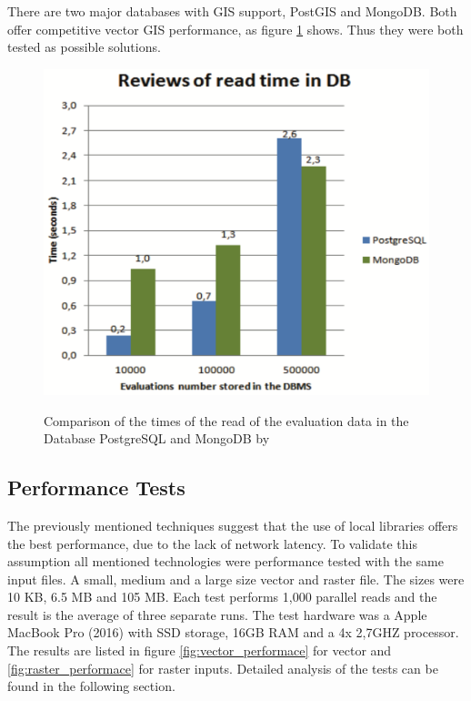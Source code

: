 There are two major databases with GIS support, PostGIS and MongoDB. Both offer competitive vector GIS performance, as figure \ref{img:mongo-vs-postgres} shows. Thus they were both tested as possible solutions.

\begin{figure}[H]
	\centering
	\includegraphics[width=0.6\columnwidth]{res/mongo-vs-postgres}\\
	\caption[]{Comparison of the times of the read of the evaluation data in the Database PostgreSQL and MongoDB by \cite{Maia2016}}
	\label{img:mongo-vs-postgres}
\end{figure}


\subsection{Performance Tests}
The previously mentioned techniques suggest that the use of local libraries offers the best performance, due to the lack of network latency. To validate this assumption all mentioned technologies were performance tested with the same input files. A small, medium and a large size vector and raster file. The sizes were 10 KB, 6.5 MB and 105 MB. Each test performs 1,000 parallel reads and the result is the average of three separate runs. The test hardware was a Apple MacBook Pro (2016) with SSD storage, 16GB RAM and a 4x 2,7GHZ processor.\\
The results are listed in figure \ref{fig:vector_performace} for vector and \ref{fig:raster_performace} for raster inputs. Detailed analysis of the tests can be found in the following section.


